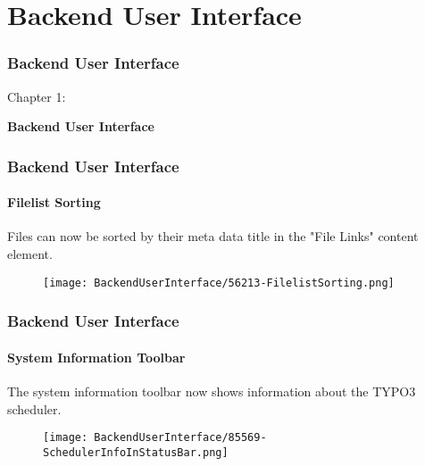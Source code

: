 %

\section{Backend User Interface}
\begin{frame}[fragile]
	\frametitle{Backend User Interface}

	\begin{center}\huge{Chapter 1:}\end{center}
	\begin{center}\huge{\color{typo3darkgrey}\textbf{Backend User Interface}}\end{center}

\end{frame}


\begin{frame}[fragile]
	\frametitle{Backend User Interface}
	\framesubtitle{Filelist Sorting}

	Files can now be sorted by their meta data title in the "File Links" content element.

	\begin{figure}
		\texttt{[image: BackendUserInterface/56213-FilelistSorting.png]}
	\end{figure}

\end{frame}


\begin{frame}[fragile]
	\frametitle{Backend User Interface}
	\framesubtitle{System Information Toolbar}

	The system information toolbar now shows information about the TYPO3 scheduler.

	\begin{figure}
		\texttt{[image: BackendUserInterface/85569-SchedulerInfoInStatusBar.png]}
	\end{figure}

\end{frame}

